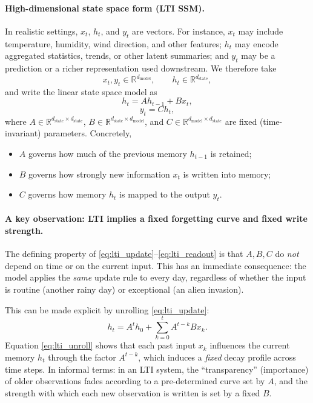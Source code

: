 \documentclass[a4paper,11pt]{article}
\begin{document}
\paragraph{High-dimensional state space form (LTI SSM).}
In realistic settings, $x_t$, $h_t$, and $y_t$ are vectors. For instance, $x_t$ may include temperature, humidity, wind direction, and other features; $h_t$ may encode aggregated statistics, trends, or other latent summaries; and $y_t$ may be a prediction or a richer representation used downstream. We therefore take
\[
x_t, y_t \in \mathbb{R}^{d_{\text{model}}}, 
\qquad
h_t \in \mathbb{R}^{d_{\text{state}}},
\]
and write the linear state space model as
\begin{equation}
    h_t = A h_{t-1} + B x_t,
    \label{eq:lti_update}
\end{equation}
\begin{equation}
    y_t = C h_t,
    \label{eq:lti_readout}
\end{equation}
where $A \in \mathbb{R}^{d_{\text{state}} \times d_{\text{state}}}$, $B \in \mathbb{R}^{d_{\text{state}} \times d_{\text{model}}}$, and $C \in \mathbb{R}^{d_{\text{model}} \times d_{\text{state}}}$ are fixed (time-invariant) parameters. Concretely,
\begin{itemize}
    \item $A$ governs how much of the previous memory $h_{t-1}$ is retained;
    \item $B$ governs how strongly new information $x_t$ is written into memory;
    \item $C$ governs how memory $h_t$ is mapped to the output $y_t$.
\end{itemize}

\paragraph{A key observation: LTI implies a fixed forgetting curve and fixed write strength.}
The defining property of \eqref{eq:lti_update}--\eqref{eq:lti_readout} is that $A,B,C$ do \emph{not} depend on time or on the current input. This has an immediate consequence: the model applies the \emph{same} update rule to every day, regardless of whether the input is routine (another rainy day) or exceptional (an alien invasion).

This can be made explicit by unrolling \eqref{eq:lti_update}:
\begin{equation}
    h_t = A^t h_0 + \sum_{k=0}^{t} A^{t-k} B x_k.
    \label{eq:lti_unroll}
\end{equation}
Equation \eqref{eq:lti_unroll} shows that each past input $x_k$ influences the current memory $h_t$ through the factor $A^{t-k}$, which induces a \emph{fixed} decay profile across time steps. In informal terms: in an LTI system, the ``transparency'' (importance) of older observations fades according to a pre-determined curve set by $A$, and the strength with which each new observation is written is set by a fixed $B$.
\end{document}
